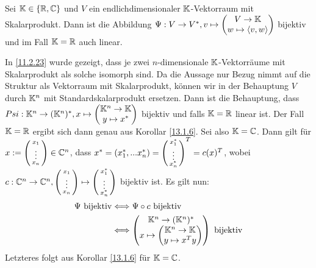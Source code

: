 \documentclass[../../main.tex]{subfiles}
\begin{document}
\begin{kor}\label{13.1.7}
Sei $\mathbb K\in \{\mathbb R, \mathbb C\}$ und $V$ ein endlichdimensionaler $\mathbb K$-Vektorraum mit Skalarprodukt. Dann ist die Abbildung $\Psi: V\to V^*, v\mapsto\begin{pmatrix*}V\to \K \\w\mapsto \scal{v,w}\end{pmatrix*}$  bijektiv und im Fall $\mathbb K=\mathbb R$ auch linear.
\end{kor}
\begin{cproof}
In \ref{11.2.23} wurde gezeigt, dass je zwei $n$-dimensionale $\mathbb K$-Vektorräume mit Skalarprodukt als solche isomorph sind. Da die Aussage nur Bezug nimmt auf die Struktur als Vektorraum mit Skalarprodukt, können wir in der Behauptung $V$ durch $\mathbb K^n$ mit Standardskalarprodukt ersetzen. Dann ist die Behauptung, dass $Psi: \K^n\to (\K^n)^*, x\mapsto\begin{pmatrix*}\K^n\to \K \\y\mapsto x^*\end{pmatrix*}$ bijektiv und falls $\mathbb K=\mathbb R$ linear ist. Der Fall $\mathbb K=\mathbb R$ ergibt sich dann genau aus Korollar \ref{13.1.6}. Sei also $\mathbb K=\mathbb C$. Dann gilt für $x:=\left(\begin{smallmatrix}x_1\\\vdots\\x_n\end{smallmatrix}\right)\in \mathbb C^n$, dass    
$x^*=(x_1^*,...x_n^*)=\left(\begin{smallmatrix}x_1^*\\\vdots\\x_n^*\end{smallmatrix}\right)^T=c(x)^T$, wobei $c: \mathbb C^n\to \mathbb C^n,\left(\begin{smallmatrix}x_1\\\vdots\\x_n\end{smallmatrix}\right)\mapsto \left(\begin{smallmatrix}x_1^*\\\vdots\\x_n^*\end{smallmatrix}\right)$ bijektiv ist. Es gilt nun:
\begin{align*}
\Psi\text{ bijektiv}&\Longleftrightarrow \Psi\circ c\text{ bijektiv}\\
&\Longleftrightarrow\begin{pmatrix*}\K^n\to (\K^n)^*\\ x\mapsto \begin{pmatrix*}\K^n\to \K\\ y\mapsto x^Ty
\end{pmatrix*}\end{pmatrix*}\text{ bijektiv}
\end{align*}
Letzteres folgt aus Korollar \ref{13.1.6} für $\mathbb K=\mathbb C$.
\end{cproof}
\end{document}

